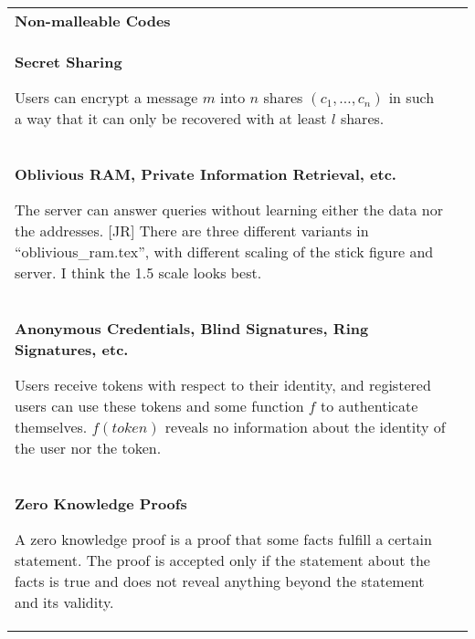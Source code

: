 \begin{longtable}{p{.4\linewidth}p{.6\linewidth}}
\textbf{Non-malleable Codes}\par
&
\begin{minipage}[t][][c]{\linewidth}
    \centering
    
\end{minipage}\\

\textbf{Secret Sharing}\par
Users can encrypt a message $m$ into $n$ shares $(c_1, \dots, c_n)$ in such a way that it can only be recovered with at least $l$ shares. 
&
\begin{minipage}[t][][c]{\linewidth}
    \centering
    
\end{minipage}\\

\textbf{Oblivious RAM, Private Information Retrieval, etc.}\par
The server can answer queries without learning either the data nor the addresses.
\alert{[JR] There are three different variants in ``oblivious\_ram.tex'', with different scaling of the stick figure and server. I think the 1.5 scale looks best.}
&
\begin{minipage}[t][][c]{\linewidth}
    \centering
    
\end{minipage}\\

\textbf{Anonymous Credentials, Blind Signatures, Ring Signatures, etc.}\par
Users receive tokens with respect to their identity, and registered users can use these tokens and some function $f$ to authenticate themselves.
$f(\mathit{token})$ reveals no information about the identity of the user nor the token.
&
\begin{minipage}[t][][c]{\linewidth}
    \centering
    
\end{minipage}\\

\textbf{Zero Knowledge Proofs}\par
A zero knowledge proof is a proof that some facts fulfill a certain statement.
The proof is accepted only if the statement about the facts is true and does not reveal anything beyond the statement and its validity.
&
\begin{minipage}[t][][c]{\linewidth}
    \centering
    
\end{minipage}\\


\end{longtable}
